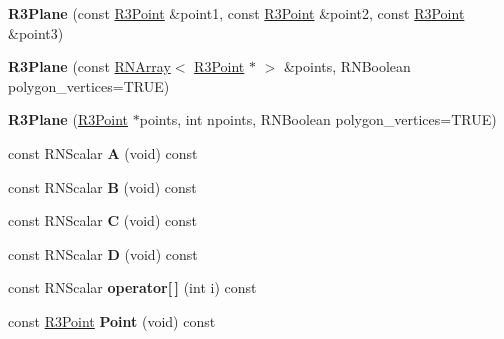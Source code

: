 \begin{DoxyCompactItemize}
\item 
{\bfseries R3\+Plane} (const \hyperlink{class_r3_point}{R3\+Point} \&point1, const \hyperlink{class_r3_point}{R3\+Point} \&point2, const \hyperlink{class_r3_point}{R3\+Point} \&point3)\hypertarget{class_r3_plane_ae3e61cce1fdb2e7a3389c261df31076e}{}\label{class_r3_plane_ae3e61cce1fdb2e7a3389c261df31076e}

\item 
{\bfseries R3\+Plane} (const \hyperlink{class_r_n_array}{R\+N\+Array}$<$ \hyperlink{class_r3_point}{R3\+Point} $\ast$ $>$ \&points, R\+N\+Boolean polygon\+\_\+vertices=T\+R\+UE)\hypertarget{class_r3_plane_a44d2356d3edbcfc3928af2b2227ea44c}{}\label{class_r3_plane_a44d2356d3edbcfc3928af2b2227ea44c}

\item 
{\bfseries R3\+Plane} (\hyperlink{class_r3_point}{R3\+Point} $\ast$points, int npoints, R\+N\+Boolean polygon\+\_\+vertices=T\+R\+UE)\hypertarget{class_r3_plane_a0eb2661363fbf9a46266b758b14347a9}{}\label{class_r3_plane_a0eb2661363fbf9a46266b758b14347a9}

\item 
const R\+N\+Scalar {\bfseries A} (void) const \hypertarget{class_r3_plane_a4aea9768246a592d03135116f0e9ff2e}{}\label{class_r3_plane_a4aea9768246a592d03135116f0e9ff2e}

\item 
const R\+N\+Scalar {\bfseries B} (void) const \hypertarget{class_r3_plane_a974857a53596fe0d4bc96a6eab4ce42e}{}\label{class_r3_plane_a974857a53596fe0d4bc96a6eab4ce42e}

\item 
const R\+N\+Scalar {\bfseries C} (void) const \hypertarget{class_r3_plane_a3a574974c6087d7ea6544b142d88f23d}{}\label{class_r3_plane_a3a574974c6087d7ea6544b142d88f23d}

\item 
const R\+N\+Scalar {\bfseries D} (void) const \hypertarget{class_r3_plane_ae9c02d14d5d8722501d0a7bc71cbaacb}{}\label{class_r3_plane_ae9c02d14d5d8722501d0a7bc71cbaacb}

\item 
const R\+N\+Scalar {\bfseries operator\mbox{[}$\,$\mbox{]}} (int i) const \hypertarget{class_r3_plane_aee92e5a0bfbdccdb3a25120685c92c2c}{}\label{class_r3_plane_aee92e5a0bfbdccdb3a25120685c92c2c}

\item 
const \hyperlink{class_r3_point}{R3\+Point} {\bfseries Point} (void) const \hypertarget{class_r3_plane_a339d225a8e0bcfb03c57ec199e3f06ee}{}\label{class_r3_plane_a339d225a8e0bcfb03c57ec199e3f06ee}


\end{DoxyCompactItemize}
